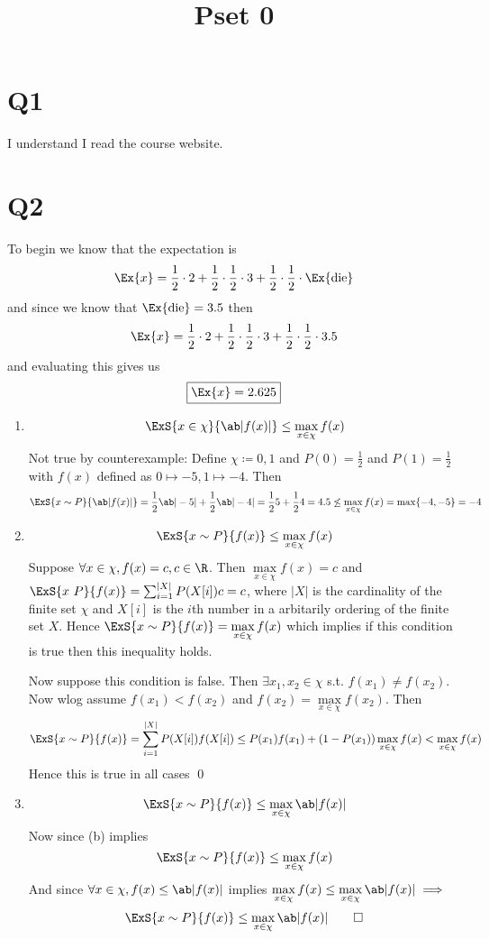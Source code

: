 \documentclass[12pt]{amsart}
\title{Pset 0}
\begin{document}
  \maketitle
  \section{Q1}
  \begin{problem}
    I understand I read the course website. 
  \end{problem}
  
  \section{Q2}
  \begin{problem}
   To begin we know that the expectation is 
   \[\Ex{x} =\frac{1}{2}\cdot2+\frac{1}{2}\cdot\frac{1}{2}\cdot3+\frac{1}{2}\cdot\frac{1}{2}\cdot\Ex{\text{die}}  \]
   and since we know that $\Ex{\text{die}} = 3.5$ then 
   \[\Ex{x} =\frac{1}{2}\cdot2+\frac{1}{2}\cdot\frac{1}{2}\cdot3+\frac{1}{2}\cdot\frac{1}{2}\cdot3.5  \]
   and evaluating this gives us 
   \[\boxed{\Ex{x}=2.625} \]
  \end{problem}
  
  \begin{problem}
    \begin{enumerate}
      \item \[\ExS{x\in\chi}{\ab|f(x)|} \leq \max\limits_{x\in \chi}f(x)\]
        Not true by counterexample: Define $\chi \coloneq {0, 1}$ and $P(0) = \frac12$ and $P(1) = \frac12$ with $f(x)$ defined as $0\mapsto -5, 1\mapsto -4$. Then 
        \[\ExS{x\sim P}{\ab|f(x)|} = \frac12\ab|-5|+\frac12\ab|-4| = \frac12 5 + \frac12 4 = 4.5 \not\leq \max\limits_{x\in\chi}f(x) = \max\{-4, -5\} = -4\]
      \item \[\ExS{x\sim P}{f(x)} \leq \max\limits_{x\in \chi}f(x)\]
        Suppose $\forall x\in\chi,f(x)=c,c\in\R$. Then $\max\limits_{x\in\chi}f(x)=c$ and $\ExS{x~P}{f(x)} = \sum_{i=1}^{|X|}P(X[i])c = c$, where $|X|$ is the cardinality of the finite set $\chi$ and $X[i]$ is the $i$th number in a arbitarily ordering of the finite set $X$. Hence $\ExS{x\sim P}{f(x)} =\max\limits_{x\in \chi}f(x)$ which implies if this condition is true then this inequality holds.

        Now suppose this condition is false. Then $\exists x_1,x_2\in\chi$ s.t. $f(x_1)\neq f(x_2)$. Now wlog assume $f(x_1)<f(x_2)$ and $f(x_2)=\max\limits_{x\in\chi}f(x_2)$. Then 
        \[\ExS{x\sim P}{f(x)} = \sum_{i=1}^{|X|}P(X[i])f(X[i]) \leq P(x_1)f(x_1) + (1-P(x_1))\max\limits_{x\in\chi}f(x) < \max\limits_{x\in\chi}f(x)\]
        Hence this is true in all cases \qed
      \item \[\ExS{x\sim P}{f(x)} \leq \max\limits_{x\in \chi}\ab|f(x)|\]
        Now since (b) implies 
        \[\ExS{x\sim P}{f(x)} \leq \max\limits_{x\in \chi}f(x)\]
        And since $\forall x\in \chi, f(x) \leq \ab|f(x)|$ implies $\max\limits_{x\in\chi}f(x) \leq \max\limits_{x\in\chi}\ab|f(x)| \implies$
        \[\ExS{x\sim P}{f(x)} \leq \max\limits_{x\in \chi}\ab|f(x)|\qed\]
    \end{enumerate} 
  \end{problem}
\end{document}
